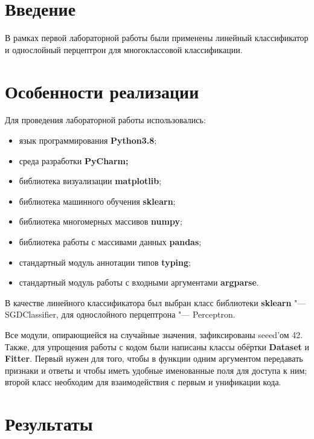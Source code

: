 \documentclass[a4paper,12pt]{article}
\begin{document}
\large

\tableofcontents
\newpage
\section{Введение}
В рамках первой лабораторной работы были применены линейный классификатор и однослойный перцептрон для многоклассовой классификации.


\section{Особенности реализации}
Для проведения лабораторной работы использовались:
\begin{itemize}
	\item язык программирования \textbf{Python3.8};
	\item среда разработки \textbf{PyCharm;}
	\item библиотека визуализации \textbf{matplotlib};
	\item библиотека машинного обучения \textbf{sklearn};
	\item библиотека многомерных массивов \textbf{numpy};
	\item библиотека работы с массивами данных \textbf{pandas};
	\item стандартный модуль аннотации типов \textbf{typing};
	\item стандартный модуль работы с входными аргументами \textbf{argparse}.
\end{itemize}

В качестве линейного классификатора был выбран класс библиотеки \textbf{sklearn} "--- SGDClassifier, для однослойного перцептрона "--- Perceptron.

Все модули, опирающиейся на случайные значения, зафиксированы seeed'ом 42. Также, для упрощения работы с кодом были написаны классы обёртки \textbf{Dataset} и \textbf{Fitter}. Первый нужен для того, чтобы в функции одним аргументом передавать признаки и ответы и чтобы иметь удобные именованные поля для доступа к ним; второй класс необходим для взаимодействия с первым и унификации кода.

\newpage
\section{Результаты}


\end{document}
